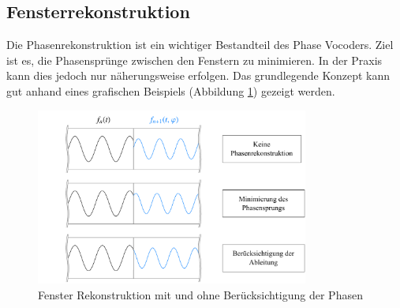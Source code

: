 \subsection{Fensterrekonstruktion
\label{autotune:subsection:fensterRekonstruktion}}
Die Phasenrekonstruktion ist ein wichtiger Bestandteil des Phase Vocoders.
Ziel ist es, die Phasensprünge zwischen den Fenstern zu minimieren.
In der Praxis kann dies jedoch nur näherungsweise erfolgen.
Das grundlegende Konzept kann gut anhand eines grafischen Beispiels (Abbildung \ref{autotune:fig:phaseReconstruction}) gezeigt werden.
\begin{figure}
    \centering
    \includegraphics[width=0.8\textwidth]{papers/autotune/images/Fenster-Rekonstruktion.pdf}
    \caption{Fenster Rekonstruktion mit und ohne Berücksichtigung der Phasen}
    \label{autotune:fig:phaseReconstruction}
\end{figure}

